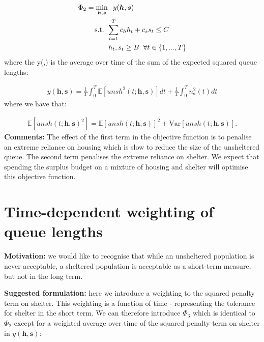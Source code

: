 \documentclass{article}
\begin{document}
\begin{align*}
        & \Phi_2 = \min_{\boldsymbol{h},\boldsymbol{s}} \hspace{0.2cm} y(\boldsymbol{h},\boldsymbol{s}) \\
        & \hspace{0.7cm} \text{ s.t. } \sum_{t=1}^{T} c_{h}h_{t} + c_{s}s_{t} \leq C \\
        & \hspace{1.5cm} h_t, s_t \geq B \hspace{0.2cm} \forall t \in \{1, ..., T\}
\end{align*}
%
where the y(,) is the average over time of the sum of the expected squared queue lengths:

\begin{align*}
  y(\boldsymbol{h},\boldsymbol{s}) = \frac{1}{T} \int_0^T \mathbb{E}[unsh^2(t; \boldsymbol{h},\boldsymbol{s})] dt + \frac{1}{T} \int_0^T n_{\boldsymbol{s}}^2(t) dt
\end{align*}
%
where we have that:
 
\begin{align*}
  \mathbb{E}[unsh(t; \boldsymbol{h},\boldsymbol{s})^2] = \mathbb{E}[unsh(t; \boldsymbol{h},\boldsymbol{s})]^2 + \text{Var}[unsh(t; \boldsymbol{h},\boldsymbol{s})].
\end{align*}
%
\textbf{Comments:} The effect of the first term in the objective function is to penalise an extreme reliance on housing which is slow to reduce the size of the unsheltered queue. The second term penalises the extreme reliance on shelter. We expect that spending the surplus budget on a mixture of housing and shelter will optimise this objective function. 
%
\newpage

\section{Time-dependent weighting of queue lengths}

\textbf{Motivation:} we would like to recognise that while an unsheltered population is never acceptable, a sheltered population is acceptable as a short-term measure, but not in the long term. \par 
%
\textbf{Suggested formulation:} here we introduce a weighting to the squared penalty term on shelter. This weighting is a function of time - representing the tolerance for shelter in the short term. 
%
We can therefore introduce $\Phi_3$ which is identical to $\Phi_2$ except for a weighted average over time of the squared penalty term on shelter in $y(\boldsymbol{h},\boldsymbol{s})$: 
\end{document}
